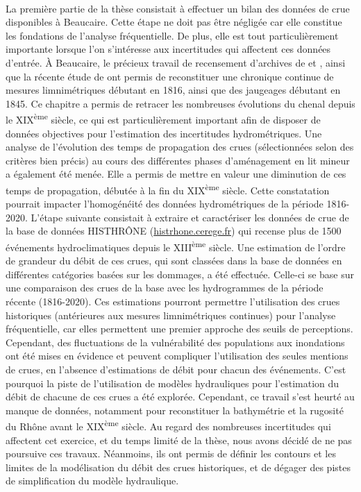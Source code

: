 	\paragraph{} La première partie de la thèse consistait à effectuer un bilan des données de crue disponibles à Beaucaire. Cette étape ne doit pas être négligée car elle constitue les fondations de l'analyse fréquentielle. De plus, elle est tout particulièrement importante lorsque l'on s'intéresse aux incertitudes qui affectent ces données d'entrée. À Beaucaire, le précieux travail de recensement d'archives de \citet{pichard_les_1995} et \citet{pichard_hydro-climatology_2017}, ainsi que la récente étude de \citet{bard_actualisation_2018} ont permis de reconstituer une chronique continue de mesures limnimétriques débutant en 1816, ainsi que des jaugeages débutant en 1845. Ce chapitre a permis de retracer les nombreuses évolutions du chenal depuis le XIX\textsuperscript{ème} siècle, ce qui est particulièrement important afin de disposer de données objectives pour l'estimation des incertitudes hydrométriques. Une analyse de l'évolution des temps de propagation des crues (sélectionnées selon des critères bien précis) au cours des différentes phases d'aménagement en lit mineur a également été menée. Elle a permis de mettre en valeur une diminution de ces temps de propagation, débutée à la fin du XIX\textsuperscript{ème} siècle. Cette constatation pourrait impacter l'homogénéité des données hydrométriques de la période 1816-2020. L'étape suivante consistait à extraire et caractériser les données de crue de la base de données HISTHRÔNE (\url{histrhone.cerege.fr}) qui recense plus de 1500 événements hydroclimatiques depuis le XIII\textsuperscript{ème} siècle. Une estimation de l'ordre de grandeur du débit de ces crues, qui sont classées dans la base de données en différentes catégories basées sur les dommages, a été effectuée. Celle-ci se base sur une comparaison des crues de la base avec les hydrogrammes de la période récente (1816-2020). Ces estimations pourront permettre l'utilisation des crues historiques (antérieures aux mesures limnimétriques continues) pour l'analyse fréquentielle, car elles permettent une premier approche des seuils de perceptions. Cependant, des fluctuations de la vulnérabilité des populations aux inondations ont été mises en évidence et peuvent compliquer l'utilisation des seules mentions de crues, en l'absence d'estimations de débit pour chacun des événements. C'est pourquoi la piste de l'utilisation de modèles hydrauliques pour l'estimation du débit de chacune de ces crues a été explorée. Cependant, ce travail s'est heurté au manque de données, notamment pour reconstituer la bathymétrie et la rugosité du Rhône avant le XIX\textsuperscript{ème} siècle. Au regard des nombreuses incertitudes qui affectent cet exercice, et du temps limité de la thèse, nous avons décidé de ne pas poursuive ces travaux. Néanmoins, ils ont permis de définir les contours et les limites de la modélisation du débit des crues historiques, et de dégager des pistes de simplification du modèle hydraulique. 
	
